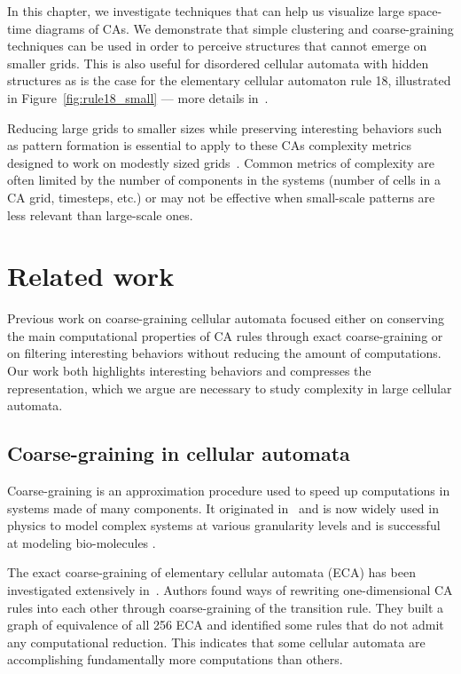 In this chapter, we investigate techniques that can help us visualize large
space-time diagrams of CAs. We demonstrate that simple clustering and
coarse-graining techniques can be used in order to perceive structures that
cannot emerge on smaller grids. This is also useful for disordered cellular
automata with hidden structures as is the case for the elementary cellular
automaton rule 18, illustrated in Figure~\ref{fig:rule18_small} --- more details
in~.

Reducing large grids to smaller sizes while preserving interesting behaviors
such as pattern formation is essential to apply to these CAs complexity metrics
designed to work on modestly sized
grids~\parencite{grassbergerQuantitativeTheorySelfgenerated1986,
  zenilCompressionBasedInvestigationDynamical2010,
  soler-toscanoCalculatingKolmogorovComplexity2014,
  zenilTwodimensionalKolmogorovComplexity2015}. Common metrics of complexity are
often limited by the number of components in the systems (number of cells in a
CA grid, timesteps, etc.) or may not be effective when small-scale patterns are
less relevant than large-scale ones.

\section{Related work}

Previous work on coarse-graining cellular automata focused either on conserving
the main computational properties of CA rules through exact coarse-graining or
on filtering interesting behaviors without reducing the amount of computations.
Our work both highlights interesting behaviors and compresses the
representation, which we argue are necessary to study complexity in large
cellular automata.

\subsection{Coarse-graining in cellular automata}

Coarse-graining is an approximation procedure used to speed up computations in
systems made of many components. It originated
in~\parencite{levittComputerSimulationProtein1975} and is now widely used in physics
to model complex systems at various granularity levels and is successful at
modeling bio-molecules \parencite{potoyanRecentSuccessesCoarsegrained2013,
  ingolfssonPowerCoarseGraining2014, kmiecikCoarseGrainedProteinModels2016}.

The exact coarse-graining of elementary cellular automata (ECA) has been
investigated extensively
in~\parencite{israeliComputationalIrreducibilityPredictability2004,
  israeliCoarsegrainingCellularAutomata2006}. Authors found ways of rewriting
one-dimensional CA rules into each other through coarse-graining of the
transition rule. They built a graph of equivalence of all 256 ECA and identified
some rules that do not admit any computational reduction. This indicates that
some cellular automata are accomplishing fundamentally more computations than
others.

